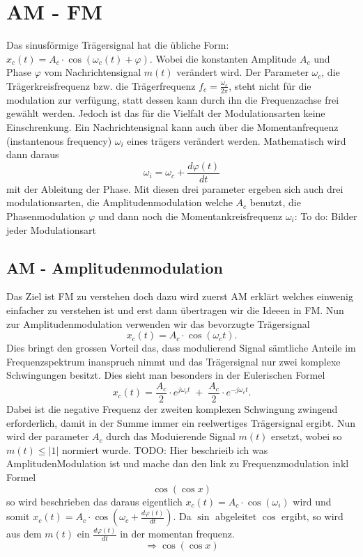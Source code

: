 %
%
%
\section{AM - FM\label{fm:section:teil0}}

Das sinusförmige Trägersignal hat die übliche Form: 
\(x_c(t) = A_c \cdot \cos(\omega_c(t)+\varphi)\).
Wobei die konstanten Amplitude \(A_c\) und Phase \(\varphi\) vom Nachrichtensignal \(m(t)\) verändert wird.
Der Parameter \(\omega_c\), die Trägerkreisfrequenz bzw. die Trägerfrequenz \(f_c = \frac{\omega_c}{2\pi}\),
steht nicht für die modulation zur verfügung, statt dessen kann durch ihn die Frequenzachse frei gewählt werden.
\newblockpunct
Jedoch ist das für die Vielfalt der Modulationsarten keine Einschrenkung.
Ein Nachrichtensignal kann auch über die Momentanfrequenz (instantenous frequency) \(\omega_i\) eines trägers verändert werden.
Mathematisch wird dann daraus
\[
    \omega_i = \omega_c + \frac{d \varphi(t)}{dt}
\]
mit der Ableitung der Phase\cite{fm:NAT}.
Mit diesen drei parameter ergeben sich auch drei modulationsarten, die Amplitudenmodulation welche \(A_c\) benutzt, 
die Phasenmodulation \(\varphi\) und dann noch die Momentankreisfrequenz \(\omega_i\):
\newline
\newline
To do: Bilder jeder Modulationsart

\subsection{AM - Amplitudenmodulation}
Das Ziel ist FM zu verstehen doch dazu wird zuerst AM erklärt welches einwenig einfacher zu verstehen ist und erst dann übertragen wir die Ideeen in FM.
Nun zur Amplitudenmodulation verwenden wir das bevorzugte Trägersignal
\[
    x_c(t) = A_c \cdot \cos(\omega_ct).
\]
Dies bringt den grossen Vorteil das, dass modulierend Signal sämtliche Anteile im Frequenzspektrum inanspruch nimmt 
und das Trägersignal nur  zwei komplexe Schwingungen besitzt. 
Dies sieht man besonders in der Eulerischen Formel
\[
    x_c(t) = \frac{A_c}{2} \cdot e^{j\omega_ct}\;+\;\frac{A_c}{2} \cdot e^{-j\omega_ct}.
\]
Dabei ist die negative Frequenz der zweiten komplexen Schwingung zwingend erforderlich, damit in der Summe immer ein reelwertiges Trägersignal ergibt.
Nun wird der parameter \(A_c\) durch das  Moduierende Signal \(m(t)\) ersetzt, wobei so \(m(t) \leqslant |1|\) normiert wurde.
\newline
\newline
TODO:
Hier beschrieib ich was AmplitudenModulation ist und mache dan den link zu Frequenzmodulation inkl Formel \[\cos( \cos x)\]
so wird beschrieben das daraus eigentlich \(x_c(t) = A_c \cdot \cos(\omega_i)\) wird und somit \(x_c(t) = A_c \cdot \cos(\omega_c + \frac{d \varphi(t)}{dt})\).
Da \(\sin \) abgeleitet \(\cos \) ergibt, so wird aus dem \(m(t)\) ein \( \frac{d \varphi(t)}{dt}\)  in der momentan frequenz. \[ \Rightarrow \cos( \cos x) \]
